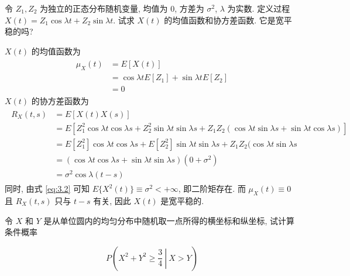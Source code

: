 \documentclass[boxes]{homework}
\begin{document}
\begin{problem}
    令 $Z_1, Z_2$ 为独立的正态分布随机变量, 均值为 $0$, 方差为 $\sigma^2$, $\lambda$ 为实数. 定义过程 $X(t) = Z_1\cos\lambda t + Z_2\sin\lambda t$. 试求 $X(t)$ 的均值函数和协方差函数. 它是宽平稳的吗?
\end{problem}
\begin{solution}
    $X(t)$ 的均值函数为
    \begin{align}
        \begin{aligned}
            \mu_X(t) &= E[X(t)]\\
            &= \cos\lambda tE[Z_1]+\sin\lambda tE[Z_2]\\
            &= 0
        \end{aligned}
    \end{align}
    $X(t)$ 的协方差函数为
    \begin{align}
        \begin{aligned}
            \label{eq:3.2}
            R_X(t, s) &= E[X(t)X(s)]\\
            &= E[Z_1^2\cos\lambda t\cos\lambda s + Z_2^2\sin\lambda t\sin\lambda s + Z_1Z_2(\cos\lambda t \sin\lambda s + \sin\lambda t\cos\lambda s)]\\
            &= E[Z_1^2]\cos\lambda t\cos\lambda s + E[Z_2^2]\sin\lambda t\sin\lambda s + Z_1Z_2(\cos\lambda t \sin\lambda s\\
            &= (\cos\lambda t\cos\lambda s + \sin\lambda t\sin\lambda s)(0 + \sigma^2)\\
            &= \sigma^2\cos\lambda(t-s)
        \end{aligned}
    \end{align}
    同时, 由式 \ref{eq:3.2} 可知 $E\{X^2(t)\}\equiv \sigma^2<+\infty$, 即二阶矩存在. 而 $\mu_X(t)\equiv 0$ 且 $R_X(t, s)$ 只与 $t-s$ 有关, 因此 $X(t)$ 是宽平稳的.
\end{solution}
\begin{problem}
令 $X$ 和 $Y$ 是从单位圆内的均匀分布中随机取一点所得的横坐标和纵坐标, 试计算条件概率

\begin{equation}
    P\left(\left.X^2+Y^2\ge \frac{3}{4}\ \right\vert\  X>Y\right)
\end{equation}

\end{problem}
\end{document}
